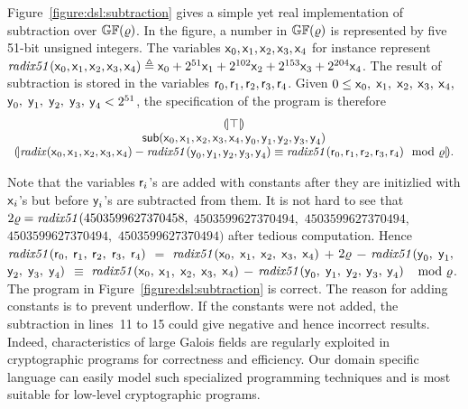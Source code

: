 Figure~\ref{figure:dsl:subtraction} gives a simple yet real
implementation of subtraction over $\mathbb{GF}(\varrho)$. 
In the figure, a number in $\mathbb{GF}(\varrho)$ 
is represented by five 51-bit unsigned integers. The variables
$\mbox{\textsf{x}}_0, \mbox{\textsf{x}}_1, \mbox{\textsf{x}}_2, \mbox{\textsf{x}}_3,
\mbox{\textsf{x}}_4$ for instance represent 
$\mathit{radix51}(\mbox{\textsf{x}}_0, \mbox{\textsf{x}}_1, \mbox{\textsf{x}}_2,
\mbox{\textsf{x}}_3, \mbox{\textsf{x}}_4) \triangleq
\mbox{\textsf{x}}_0 + 2^{51} \mbox{\textsf{x}}_1 + 2^{102} \mbox{\textsf{x}}_2 +
2^{153} \mbox{\textsf{x}}_3 + 2^{204} \mbox{\textsf{x}}_4$. The result of
subtraction is stored in the variables $\mbox{\textsf{r}}_0, \mbox{\textsf{r}}_1,
\mbox{\textsf{r}}_2, \mbox{\textsf{r}}_3, \mbox{\textsf{r}}_4$. 
Given $0 \leq \mbox{\textsf{x}}_0,$ $\mbox{\textsf{x}}_1,$ $\mbox{\textsf{x}}_2,$
$\mbox{\textsf{x}}_3,$ $\mbox{\textsf{x}}_4,$ $\mbox{\textsf{y}}_0,$ $\mbox{\textsf{y}}_1,$
$\mbox{\textsf{y}}_2,$ $\mbox{\textsf{y}}_3,$ $\mbox{\textsf{y}}_4 < 2^{51}$, 
the specification of the program is therefore
\[
\begin{array}{c}
{(\!|}{\top}{|\!)}\\
\mbox{\textsf{sub}}(\mbox{\textsf{x}}_0, \mbox{\textsf{x}}_1, \mbox{\textsf{x}}_2,
  \mbox{\textsf{x}}_3, \mbox{\textsf{x}}_4, \mbox{\textsf{y}}_0, \mbox{\textsf{y}}_1,
  \mbox{\textsf{y}}_2, \mbox{\textsf{y}}_3, \mbox{\textsf{y}}_4)\\
{(\!|}{\mathit{radix}(\mbox{\textsf{x}}_0, \mbox{\textsf{x}}_1, \mbox{\textsf{x}}_2,
\mbox{\textsf{x}}_3, \mbox{\textsf{x}}_4) -
\mathit{radix51}(\mbox{\textsf{y}}_0, \mbox{\textsf{y}}_1, \mbox{\textsf{y}}_2,
\mbox{\textsf{y}}_3, \mbox{\textsf{y}}_4)
\equiv
\mathit{radix51}(\mbox{\textsf{r}}_0, \mbox{\textsf{r}}_1, \mbox{\textsf{r}}_2,
\mbox{\textsf{r}}_3, \mbox{\textsf{r}}_4)
\mod {\varrho}
}{|\!)}.
\end{array}
\]

Note that the variables $\mbox{\textsf{r}}_i$'s are added with constants
after they are initizlied with $\mbox{\textsf{x}}_i$'s but before
$\mbox{\textsf{y}}_i$'s are subtracted from them. It is not hard to see that
$2\varrho = \mathit{radix51} (4503599627370458,$ $4503599627370494,$
$4503599627370494,$ $4503599627370494,$ $4503599627370494)$
after tedious computation. Hence $\mathit{radix51}(\mbox{\textsf{r}}_0,$
$\mbox{\textsf{r}}_1,$ $\mbox{\textsf{r}}_2,$ $\mbox{\textsf{r}}_3,$ $\mbox{\textsf{r}}_4)$ $=$
$\mathit{radix51}(\mbox{\textsf{x}}_0,$ $\mbox{\textsf{x}}_1,$ $\mbox{\textsf{x}}_2,$
$\mbox{\textsf{x}}_3,$ $\mbox{\textsf{x}}_4)$ $+$ $2 \varrho $ $-$
$\mathit{radix51}(\mbox{\textsf{y}}_0,$ $\mbox{\textsf{y}}_1,$ $\mbox{\textsf{y}}_2,$
$\mbox{\textsf{y}}_3,$ $\mbox{\textsf{y}}_4)$ $\equiv $
$\mathit{radix51}(\mbox{\textsf{x}}_0,$ $\mbox{\textsf{x}}_1,$ $\mbox{\textsf{x}}_2,$
$\mbox{\textsf{x}}_3,$ $\mbox{\textsf{x}}_4)$ $-$
$\mathit{radix51}(\mbox{\textsf{y}}_0,$ $\mbox{\textsf{y}}_1,$ $\mbox{\textsf{y}}_2,$
$\mbox{\textsf{y}}_3,$ $\mbox{\textsf{y}}_4)$ $\mod {\varrho} $. The program in
Figure~\ref{figure:dsl:subtraction} is correct. The reason for
adding constants is to prevent underflow. If the constants were not
added, the subtraction in lines~11 to 15 could give negative and hence
incorrect results. Indeed, characteristics of large Galois fields are
regularly exploited in cryptographic programs for correctness and
efficiency. Our domain specific language can easily model such
specialized programming techniques and is most suitable for low-level
cryptographic programs.

